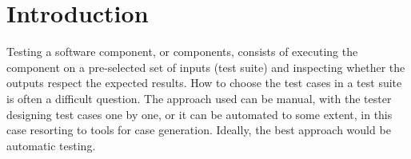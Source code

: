 
\section{Introduction}
\label{sec:intro}



Testing a software component, or components, consists of executing the component on
a pre-selected set of inputs (test suite) and inspecting whether the outputs
respect the expected results.
%
%
How to choose the test cases in a test suite is often a difficult
question.
%
The approach used
can be  manual, with the tester %
designing test cases one by 
one, or it can be automated to some extent, in this case resorting to
tools for case generation. 
%
Ideally, the best approach would be automatic testing.
%


